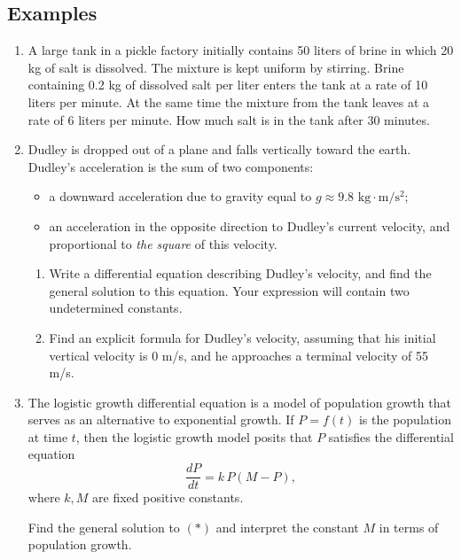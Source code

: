 \documentclass[11pt]{article}
\theoremstyle{definition}
\theoremstyle{named}
\numberwithin{myalgctr}{section}
\begin{document}
\subsection*{Examples}
\begin{enumerate}
  \item A large tank in a pickle factory initially contains 50 liters of brine in which 20 kg of salt is dissolved. The mixture is kept uniform by stirring. Brine containing 0.2 kg of dissolved salt per liter enters the tank at a rate of 10 liters per minute. At the same time the mixture from the tank leaves at a rate of 6 liters per minute. How much salt is in the tank after 30 minutes.
  \item Dudley is dropped out of a plane and falls vertically toward the earth. Dudley's acceleration is the sum of two components:
  \begin{itemize}[itemsep=0pt, topsep=0pt]
    \item a downward acceleration due to gravity equal to $g\approx 9.8\text{ kg}\cdot \text{m}/\text{s}^2$;
    \item an acceleration in the opposite direction to Dudley's current velocity, and proportional to {\em the square} of this velocity.
  \end{itemize}
  \begin{enumerate}
    \item Write a differential equation describing Dudley's velocity, and find the general solution to this equation. Your expression will contain two undetermined constants.
    \item Find an explicit formula for Dudley's velocity, assuming that his initial vertical velocity is 0 m/s, and he approaches a terminal velocity of 55 m/s.
  \end{enumerate}
  \item The logistic growth differential equation is a model of population growth that serves as an alternative to exponential growth. If $P=f(t)$ is the population at time $t$, then the logistic growth model posits that $P$ satisfies the differential equation
  \[
  \frac{dP}{dt}=k\, P(M-P), \tag{$*$}
  \]
  where $k, M$ are fixed positive constants.

  Find the general solution to $(*)$ and interpret the constant $M$ in terms of population growth.
\end{enumerate}
\end{document}
